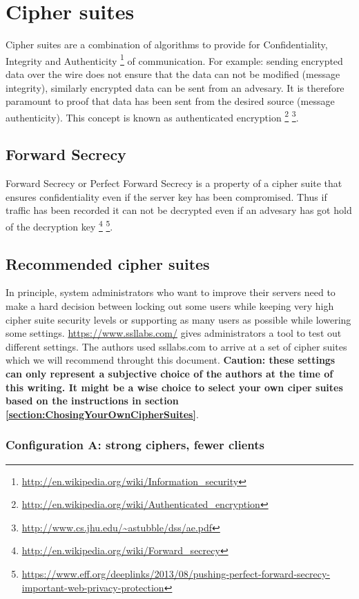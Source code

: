 \section{Cipher suites}

Cipher suites are a combination of algorithms to provide for 
Confidentiality, Integrity and Authenticity
\footnote{\url{http://en.wikipedia.org/wiki/Information\_security}} of 
communication. For example: sending encrypted data over the wire does not 
ensure that the data can not be modified (message integrity), similarly
encrypted data can be sent from an advesary. It is therefore paramount to
proof that data has been sent from the desired source (message authenticity).
This concept is known as authenticated encryption
\footnote{\url{http://en.wikipedia.org/wiki/Authenticated\_encryption}}
\footnote{\url{http://www.cs.jhu.edu/~astubble/dss/ae.pdf}}.

\subsection{Forward Secrecy}
Forward Secrecy or Perfect Forward Secrecy is a property of a cipher suite 
that ensures confidentiality even if the server key has been compromised.
Thus if traffic has been recorded it can not be decrypted even if an advesary
has got hold of the decryption key
\footnote{\url{http://en.wikipedia.org/wiki/Forward\_secrecy}}
\footnote{\url{https://www.eff.org/deeplinks/2013/08/pushing-perfect-forward-secrecy-important-web-privacy-protection}}. 

\subsection{Recommended cipher suites}

In principle, system administrators who want to improve their servers need to
make a hard decision between locking out some users while keeping very high
cipher suite security levels or supporting as many users as possible while
lowering some settings. \url{https://www.ssllabs.com/} gives administrators a
tool to test out different settings. The authors used ssllabs.com to arrive at
a set of cipher suites which we will recommend throught this document.
\textbf{Caution: these settings can only represent a subjective choice of the
authors at the time of this writing. It might be a wise choice to select your
own ciper suites based on the instructions in section
\ref{section:ChosingYourOwnCipherSuites}}.


\subsubsection{Configuration A: strong ciphers, fewer clients}

